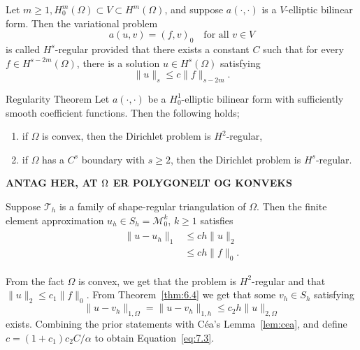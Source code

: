 \begin{defn}{\quad\label{defn:7.1}}
    Let $m\geq 1, H^m_0(\Omega)\subset V\subset H^m(\Omega)$, and suppose $a(\cdot,\cdot)$ is a $V$-elliptic bilinear form. 
    Then the variational problem
    \begin{equation}
        a(u,v) = {(f,v)}_0\quad \text{for all } v\in V
    \end{equation}
    is called $H^s$-regular provided that there exists a constant $C$ such that for every  $f\in H^{s-2m}(\Omega)$,
    there is a solution $u\in H^s(\Omega)$ satisfying
    \begin{equation}
        \|u\|_s\leq c\|f\|_{s-2m}.
    \end{equation}
\end{defn}

\begin{thmx}{Regularity Theorem}
    Let $a(\cdot,\cdot)$ be a $H^1_0$-elliptic bilinear form with sufficiently smooth coefficient functions. Then the following holds; 
    \begin{enumerate}
        \item if $\Omega$ is convex, then the Dirichlet problem is $H^2$-regular, 
        \item if $\Omega$ has a $C^s$ boundary with $s\geq 2$, then the Dirichlet problem is $H^s$-regular.
    \end{enumerate}
\end{thmx}

\textbf{ANTAG HER, AT $\Omega$ ER POLYGONELT OG KONVEKS}

\begin{thmx}{\quad}
    Suppose $\mathcal{T}_h$ is a family of shape-regular triangulation of $\Omega$. 
    Then the finite element approximation $u_h\in S_h = \mathcal{M}^k_0$, $k\geq 1$ satisfies
    \begin{align}
        \begin{split}
            \|u-u_h\|_1&\leq ch\|u\|_2\ \\
            &\leq ch\|f\|_0.
        \end{split}
        \label{eq:7.3}
    \end{align}\label{thm:7.3}
\end{thmx}
\begin{bev}
    From the fact $\Omega$ is convex, we get that the problem is $H^2$-regular and that $\|u\|_2 \leq c_1\|f\|_0$.
    From Theorem~\ref{thm:6.4} we get that some $v_h\in S_h$ satisfying 
    \begin{equation}
    \|u-v_h\|_{1,\Omega} = \|u-v_h\|_{1,h} \leq c_2h\|u\|_{2,\Omega}
    \end{equation}
    exists. 
    Combining the prior statements with Céa's Lemma~\ref{lem:cea}, and 
    define $c = (1+c_1)c_2C/\alpha$ 
    to obtain Equation~\ref{eq:7.3}.
\end{bev}